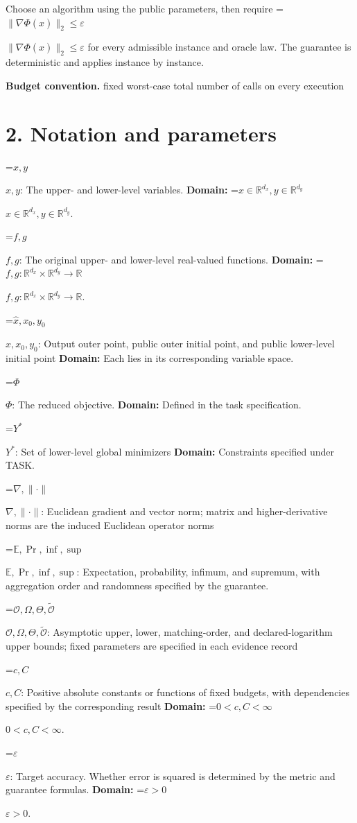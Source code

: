 \documentclass[10pt,a4paper]{article}
\newcommand{\AtlasMath}[1]{\par\begingroup\centering\setbox0=\hbox{$\displaystyle #1$}\ifdim\wd0>1.4\linewidth\typeout{ATLAS WIDE FORMULA: \the\wd0}\fi\ifdim\wd0>\linewidth\resizebox{\linewidth}{!}{\box0}\else\box0\fi\par\endgroup}
\newcommand{\AtlasInlineMath}[1]{\begingroup\setbox0=\hbox{$#1$}\ifdim\wd0>.4\linewidth\endgroup\AtlasMath{#1}\else\endgroup$#1$\fi}
\begin{document}
Choose an algorithm using the public parameters, then require \AtlasInlineMath{\|\nabla\Phi(\widehat{x})\|_2\le\varepsilon} for every admissible instance and oracle law. The guarantee is deterministic and applies instance by instance.

\textbf{Budget convention.} fixed worst-case total number of calls on every execution

\section{2. Notation and parameters}
\AtlasInlineMath{x,y}: The upper- and lower-level variables. \textbf{Domain:} \AtlasInlineMath{x\in\mathbb R^{d_x},y\in\mathbb R^{d_y}}.

\AtlasInlineMath{f,g}: The original upper- and lower-level real-valued functions. \textbf{Domain:} \AtlasInlineMath{f,g:\mathbb R^{d_x}\times\mathbb R^{d_y}\to\mathbb R}.

\AtlasInlineMath{\widehat x,x_0,y_0}: Output outer point, public outer initial point, and public lower-level initial point \textbf{Domain:} Each lies in its corresponding variable space.

\AtlasInlineMath{\Phi}: The reduced objective. \textbf{Domain:} Defined in the task specification.

\AtlasInlineMath{Y^*}: Set of lower-level global minimizers \textbf{Domain:} Constraints specified under TASK.

\AtlasInlineMath{\nabla,\|\cdot\|}: Euclidean gradient and vector norm; matrix and higher-derivative norms are the induced Euclidean operator norms

\AtlasInlineMath{\mathbb E,\Pr,\inf,\sup}: Expectation, probability, infimum, and supremum, with aggregation order and randomness specified by the guarantee.

\AtlasInlineMath{\mathcal O,\Omega,\Theta,\widetilde{\mathcal O}}: Asymptotic upper, lower, matching-order, and declared-logarithm upper bounds; fixed parameters are specified in each evidence record

\AtlasInlineMath{c,C}: Positive absolute constants or functions of fixed budgets, with dependencies specified by the corresponding result \textbf{Domain:} \AtlasInlineMath{0<c,C<\infty}.

\AtlasInlineMath{\varepsilon}: Target accuracy. Whether error is squared is determined by the metric and guarantee formulas. \textbf{Domain:} \AtlasInlineMath{\varepsilon>0}.
\end{document}
